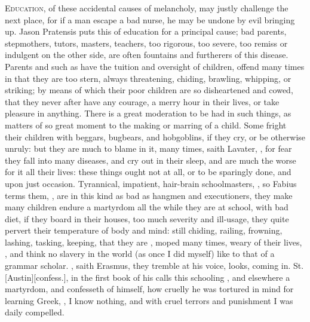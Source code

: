 \lettrine{E}{ducation}, of these accidental causes of melancholy, may justly
challenge the next place, for if a man escape a bad nurse, he may be undone by
evil bringing up. Jason Pratensis puts this of education
for a principal cause; bad parents, stepmothers, tutors, masters, teachers, too
rigorous, too severe, too remiss or indulgent on the other side, are often
fountains and furtherers of this disease. Parents and such as have the tuition
and oversight of children, offend many times in that they are too stern, always
threatening, chiding, brawling, whipping, or striking; by means of which their
poor children are so disheartened and cowed, that they never after have any
courage, a merry hour in their lives, or take pleasure in anything. There is a
great moderation to be had in such things, as matters of so great moment to the
making or marring of a child. Some fright their children with beggars,
bugbears, and hobgoblins, if they cry, or be otherwise unruly: but they are
much to blame in it, many times, saith Lavater,  , for fear they fall into many diseases, and cry out in
their sleep, and are much the worse for it all their lives: these things ought
not at all, or to be sparingly done, and upon just occasion. Tyrannical,
impatient, hair-brain schoolmasters, , so
Fabius terms them, , are in this
kind as bad as hangmen and executioners, they make many children endure a
martyrdom all the while they are at school, with bad diet, if they board in
their houses, too much severity and ill-usage, they quite pervert their
temperature of body and mind: still chiding, railing, frowning, lashing,
tasking, keeping, that they are , moped many times, weary of
their lives, ,
and think no slavery in the world (as once I did myself) like to that of a
grammar scholar. , saith Erasmus, they tremble at his voice,
looks, coming in. St. [Austin][\textlatin{confess.}], in the first book of his
 calls this schooling , and elsewhere a martyrdom, and confesseth of himself, how
cruelly he was tortured in mind for learning Greek, , I know
nothing, and with cruel terrors and punishment I was daily compelled.
